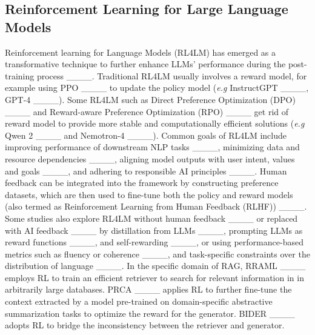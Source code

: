 \subsection{Reinforcement Learning for Large Language Models}
Reinforcement learning for Language Models (RL4LM) has emerged as a transformative technique to further enhance LLMs' performance during the post-training process ____. Traditional RL4LM usually involves a reward model, for example using PPO ____ to update the policy model (\emph{e.g} InstructGPT ____, GPT-4 ____). Some RL4LM such as Direct Preference Optimization (DPO) ____
and Reward-aware Preference Optimization (RPO) ____ get rid of reward model to provide more stable and computationally efficient solutions (\emph{e.g} Qwen 2 ____ and  Nemotron-4 ____). Common goals of RL4LM include improving performance of downstream NLP tasks ____, minimizing data and resource dependencies ____, aligning model outputs with user intent, values and goals ____, and adhering to responsible AI principles ____. Human feedback can be integrated into the framework by constructing preference datasets, which are then used to fine-tune both the policy and reward models (also termed as Reinforcement Learning from Human Feedback (RLHF)) ____. Some studies also explore RL4LM without human feedback ____ or replaced with AI feedback ____ by distillation from LLMs ____, prompting LLMs as reward functions ____, and self-rewarding ____, or using performance-based metrics such as fluency or coherence ____, and task-specific constraints over the distribution of language ____. In the specific domain of RAG, RRAML ____ employs RL to train an efficient retriever to search for relevant information in in arbitrarily large databases. PRCA ____ applies RL to further fine-tune the context extracted by a model pre-trained on domain-specific abstractive summarization tasks to optimize the reward for the generator. BIDER ____ adopts RL to bridge the inconsistency between the retriever and generator.